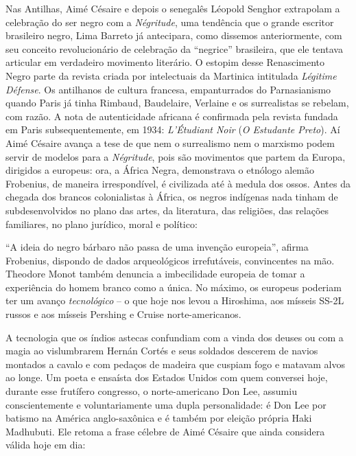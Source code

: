 \documentclass[
  letterpaper,
  DIV=11,
  numbers=noendperiod]{scrreprt}
\begin{document}
Nas Antilhas, Aimé Césaire e depois o senegalês Léopold Senghor
extrapolam a celebração do ser negro com a \emph{Négritude}, uma
tendência que o grande escritor brasileiro negro, Lima Barreto já
antecipara, como dissemos anteriormente, com seu conceito revolucionário
de celebração da ``negrice'' brasileira, que ele tentava articular em
verdadeiro movimento literário. O estopim desse Renascimento Negro parte
da revista criada por intelectuais da Martinica intitulada
\emph{Légitime Défense}. Os antilhanos de cultura francesa,
empanturrados do Parnasianismo quando Paris já tinha Rimbaud,
Baudelaire, Verlaine e os surrealistas se rebelam, com razão. A nota de
autenticidade africana é confirmada pela revista fundada em Paris
subsequentemente, em 1934: \emph{L'Étudiant Noir} (\emph{O Estudante
Preto}). Aí Aimé Césaire avança a tese de que nem o surrealismo nem o
marxismo podem servir de modelos para a \emph{Négritude}, pois são
movimentos que partem da Europa, dirigidos a europeus: ora, a África
Negra, demonstrava o etnólogo alemão Frobenius, de maneira
irrespondível, é civilizada até à medula dos ossos. Antes da chegada dos
brancos colonialistas à África, os negros indígenas nada tinham de
subdesenvolvidos no plano das artes, da literatura, das religiões, das
relações familiares, no plano jurídico, moral e político:

``A ideia do negro bárbaro não passa de uma invenção europeia'', afirma
Frobenius, dispondo de dados arqueológicos irrefutáveis, convincentes na
mão. Theodore Monot também denuncia a imbecilidade europeia de tomar a
experiência do homem branco como a única. No máximo, os europeus
poderiam ter um avanço \emph{tecnológico} -- o que hoje nos levou a
Hiroshima, aos mísseis SS-2L russos e aos mísseis Pershing e Cruise
norte-americanos.

A tecnologia que os índios astecas confundiam com a vinda dos deuses ou
com a magia ao vislumbrarem Hernán Cortés e seus soldados descerem de
navios montados a cavalo e com pedaços de madeira que cuspiam fogo e
matavam alvos ao longe. Um poeta e ensaísta dos Estados Unidos com quem
conversei hoje, durante esse frutífero congresso, o norte-americano Don
Lee, assumiu conscientemente e voluntariamente uma dupla personalidade:
é Don Lee por batismo na América anglo-saxônica e é também por eleição
própria Haki Madhubuti. Ele retoma a frase célebre de Aimé Césaire que
ainda considera válida hoje em dia:
\end{document}
